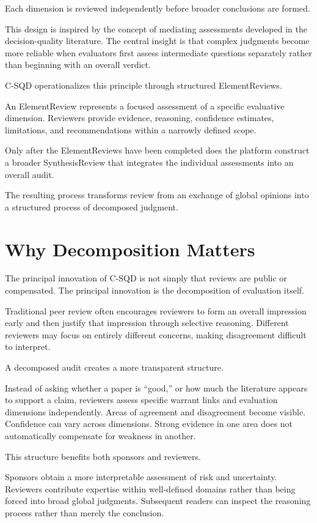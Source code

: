\documentclass[11pt]{article}
\begin{document}
Each dimension is reviewed independently before broader conclusions are formed.

This design is inspired by the concept of mediating assessments developed in the decision-quality literature. The central insight is that complex judgments become more reliable when evaluators first assess intermediate questions separately rather than beginning with an overall verdict.

C-SQD operationalizes this principle through structured ElementReviews.

An ElementReview represents a focused assessment of a specific evaluative dimension. Reviewers provide evidence, reasoning, confidence estimates, limitations, and recommendations within a narrowly defined scope.

Only after the ElementReviews have been completed does the platform construct a broader SynthesisReview that integrates the individual assessments into an overall audit.

The resulting process transforms review from an exchange of global opinions into a structured process of decomposed judgment.

\section{Why Decomposition Matters}

The principal innovation of C-SQD is not simply that reviews are public or compensated. The principal innovation is the decomposition of evaluation itself.

Traditional peer review often encourages reviewers to form an overall impression early and then justify that impression through selective reasoning. Different reviewers may focus on entirely different concerns, making disagreement difficult to interpret.

A decomposed audit creates a more transparent structure.

Instead of asking whether a paper is ``good,'' or how much the literature appears to support a claim, reviewers assess specific warrant links and evaluation dimensions independently. Areas of agreement and disagreement become visible. Confidence can vary across dimensions. Strong evidence in one area does not automatically compensate for weakness in another.

This structure benefits both sponsors and reviewers.

Sponsors obtain a more interpretable assessment of risk and uncertainty. Reviewers contribute expertise within well-defined domains rather than being forced into broad global judgments. Subsequent readers can inspect the reasoning process rather than merely the conclusion.
\end{document}
